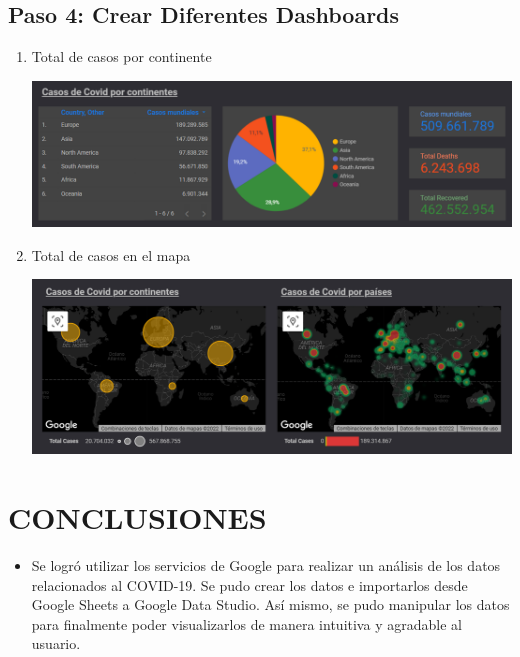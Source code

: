 \documentclass[12pt,letterpaper]{article}
\newcommand\tab[1][1cm]{\hspace*{#1}}
\begin{document}
    \subsection{Paso 4: Crear Diferentes Dashboards}
    \begin{enumerate}[\tab 1.]
        \item Total de casos por continente
        \begin{center}
            \includegraphics[width=13cm]{./img/img15.png}
        \end{center}
        \item Total de casos en el mapa
        \begin{center}
            \includegraphics[width=13cm]{./img/img16.png}
        \end{center}
    \end{enumerate}

    \newpage
    \section{CONCLUSIONES}
    \begin{itemize}
        \item Se logró utilizar los servicios de Google para realizar un análisis de los datos relacionados al COVID-19. Se pudo crear los datos e importarlos desde Google Sheets a Google Data Studio. Así mismo, se pudo manipular los datos para finalmente poder visualizarlos de manera intuitiva y agradable al usuario.
    \end{itemize}
\end{document}
